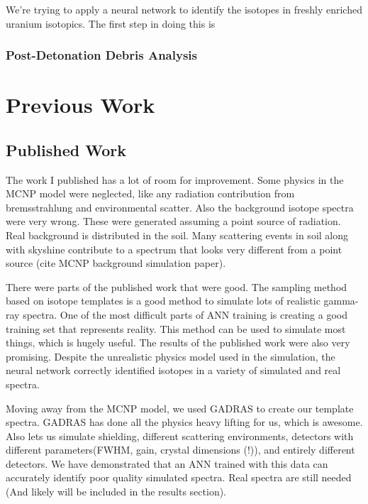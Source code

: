 \documentclass[thesis,tocnosub,noragright,centerchapter,12pt,fullpage]{uiucecethesis09}
\begin{document}
We're trying to apply a neural network to identify the isotopes in freshly enriched uranium isotopics. The first step in doing this is 



















\subsection{Post-Detonation Debris Analysis}


\chapter{Previous Work}

\section{Published Work}

The work I published has a lot of room for improvement. Some physics in the MCNP model were neglected, like any radiation contribution from bremsstrahlung and environmental scatter. Also the background isotope spectra were very wrong. These were generated assuming a point source of radiation. Real background is distributed in the soil. Many scattering events in soil along with skyshine contribute to a spectrum that looks very different from a point source (cite MCNP background simulation paper). 

There were parts of the published work that were good. The sampling method based on isotope templates is a good method to simulate lots of realistic gamma-ray spectra. One of the most difficult parts of ANN training is creating a good training set that represents reality. This method can be used to simulate most things, which is hugely useful. The results of the published work were also very promising. Despite the unrealistic physics model used in the simulation, the neural network correctly identified isotopes in a variety of simulated and real spectra. 

Moving away from the MCNP model, we used GADRAS to create our template spectra. GADRAS has done all the physics heavy lifting for us, which is awesome. Also lets us simulate shielding, different scattering environments, detectors with different parameters(FWHM, gain, crystal dimensions (!)), and entirely different detectors. We have demonstrated that an ANN trained with this data can accurately identify poor quality simulated spectra. Real spectra are still needed (And likely will be included in the results section).
\end{document}
